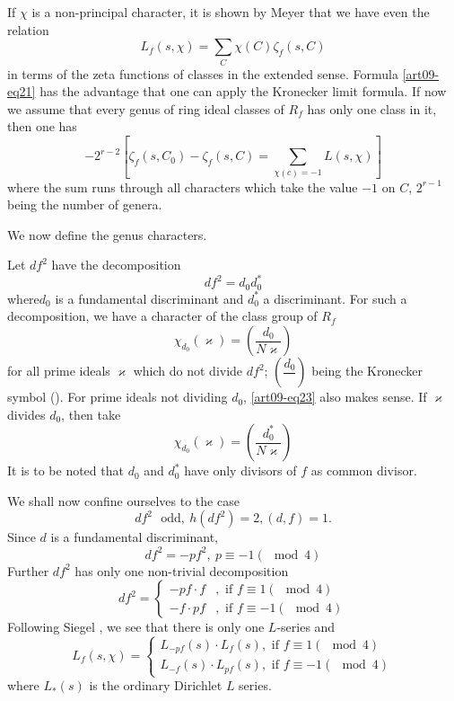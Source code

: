 If $\chi$ is a non-principal character, it is shown by Meyer that we have even the relation
\begin{equation}
L_{f}(s,\chi)=\sum\limits_{C}\chi(C)\zeta_{f}(s,C)\label{art09-eq21}
\end{equation}
in terms of the zeta functions of classes in the extended sense. Formula \eqref{art09-eq21} has the advantage that one can apply the Kronecker limit formula. If now we assume that every genus of ring ideal classes of $R_{f}$ has only one class in it, then one has
\begin{equation}
-2^{r-2}\left[\zeta_{f}(s,C_{0})-\zeta_{f}(s,C)=\sum\limits_{\chi(c)=-1}L(s,\chi)\right]\label{art09-eq22}
\end{equation}
where the sum runs through all characters which take the value $-1$ on $C$, $2^{r-1}$ being the number of genera.

We now define the genus characters.

Let $df^{2}$ have the decomposition
$$
df^{2}=d_{0}d^{*}_{0}
$$
where\pageoriginale $d_{0}$ is a fundamental discriminant and $d^{*}_{0}$ a discriminant. For such a decomposition, we have a character of the class group of $R_{f}$
$$
\chi_{d_{0}}(\varkappa)=\left(\dfrac{d_{0}}{N\varkappa}\right)
$$
for all prime ideals $\varkappa$ which do not divide $df^{2}$; $\left(\dfrac{d_{0}}{}\right)$ being the Kronecker symbol (\cite[p. 380 et seq]{art09-key9}). For prime ideals not dividing $d_{0}$, \eqref{art09-eq23} also makes sense. If $\varkappa$ divides $d_{0}$, then take
$$
\chi_{d_{0}}(\varkappa)=\left(\dfrac{d^{*}_{0}}{N\varkappa}\right)
$$
It is to be noted that $d_{0}$ and $d^{*}_{0}$ have only divisors of $f$ as common divisor.

We shall now confine ourselves to the case
\begin{equation}
df^{2}\text{~ odd}, \ h(df^{2})=2, (d,f)=1.\label{art09-eq24}
\end{equation}
Since $d$ is a fundamental discriminant,
\begin{equation}
df^{2}=-pf^{2}, \ p\equiv -1(\mod 4)\label{art09-eq25}
\end{equation}
Further $df^{2}$ has only one non-trivial decomposition
\begin{equation}
df^{2}=
\begin{cases}
-pf\cdot f & ,\text{~if~} f\equiv 1(\mod 4)\\[3pt]
-f\cdot pf & ,\text{~if~} f\equiv -1(\mod 4)
\end{cases}\label{art09-eq26}
\end{equation}
Following Siegel \cite{art09-key8}, we see that there is only one $L$-series and
$$
L_{f}(s,\chi)=
\begin{cases}
L_{-pf}(s)\cdot L_{f}(s),\text{~if~}f\equiv 1(\mod 4)\\[3pt]
L_{-f}(s)\cdot L_{pf}(s), \text{~if~} f\equiv -1(\mod 4)
\end{cases}
$$
where $L_{*}(s)$ is the ordinary Dirichlet $L$ series.

